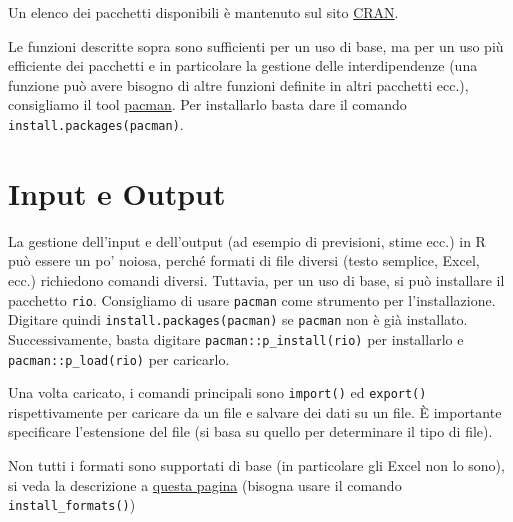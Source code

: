 \documentclass[
  italian,
  letterpaper,
]{book}
\theoremstyle{definition}
\theoremstyle{remark}
\begin{document}
Un elenco dei pacchetti disponibili è mantenuto sul sito
\href{https://cran.r-project.org/web/packages/available_packages_by_name.html}{CRAN}.

Le funzioni descritte sopra sono sufficienti per un uso di base, ma per
un uso più efficiente dei pacchetti e in particolare la gestione delle
interdipendenze (una funzione può avere bisogno di altre funzioni
definite in altri pacchetti ecc.), consigliamo il tool
\href{https://cran.r-project.org/web/packages/pacman/index.html}{pacman}.
Per installarlo basta dare il comando
\texttt{install.packages(\textquotesingle{}pacman\textquotesingle{})}.

\section{Input e Output}\label{input-e-output}

La gestione dell'input e dell'output (ad esempio di previsioni, stime
ecc.) in R può essere un po' noiosa, perché formati di file diversi
(testo semplice, Excel, ecc.) richiedono comandi diversi. Tuttavia, per
un uso di base, si può installare il pacchetto \texttt{rio}. Consigliamo
di usare \texttt{pacman} come strumento per l'installazione. Digitare
quindi
\texttt{install.packages(\textquotesingle{}pacman\textquotesingle{})} se
\texttt{pacman} non è già installato. Successivamente, basta digitare
\texttt{pacman::p\_install(\textquotesingle{}rio\textquotesingle{})} per
installarlo e
\texttt{pacman::p\_load(\textquotesingle{}rio\textquotesingle{})} per
caricarlo.

Una volta caricato, i comandi principali sono \texttt{import()} ed
\texttt{export()} rispettivamente per caricare da un file e salvare dei
dati su un file. È importante specificare l'estensione del file (si basa
su quello per determinare il tipo di file).

Non tutti i formati sono supportati di base (in particolare gli Excel
non lo sono), si veda la descrizione a
\href{https://cran.r-project.org/web/packages/rio/vignettes/rio.html}{questa
pagina} (bisogna usare il comando \texttt{install\_formats()})
\end{document}
